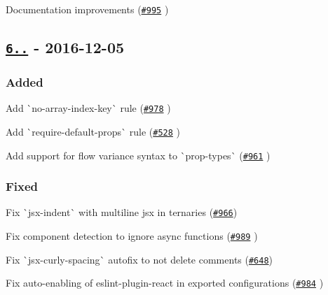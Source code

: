 \begin{DoxyItemize}
\item Documentation improvements (\href{https://github.com/yannickcr/eslint-plugin-react/pull/995}{\tt \#995} )
\end{DoxyItemize}

\subsection*{\href{https://github.com/yannickcr/eslint-plugin-react/compare/v6.7.1...v6.8.0}{\tt 6..} -\/ 2016-\/12-\/05}

\subsubsection*{Added}


\begin{DoxyItemize}
\item Add \`{}no-\/array-\/index-\/key\`{} rule (\href{https://github.com/yannickcr/eslint-plugin-react/pull/978}{\tt \#978} )
\item Add \`{}require-\/default-\/props\`{} rule (\href{https://github.com/yannickcr/eslint-plugin-react/issues/528}{\tt \#528} )
\item Add support for flow variance syntax to \`{}prop-\/types\`{} (\href{https://github.com/yannickcr/eslint-plugin-react/issues/961}{\tt \#961} )
\end{DoxyItemize}

\subsubsection*{Fixed}


\begin{DoxyItemize}
\item Fix \`{}jsx-\/indent\`{} with multiline jsx in ternaries (\href{https://github.com/yannickcr/eslint-plugin-react/issues/966}{\tt \#966})
\item Fix component detection to ignore async functions (\href{https://github.com/yannickcr/eslint-plugin-react/pull/989}{\tt \#989} )
\item Fix \`{}jsx-\/curly-\/spacing\`{} autofix to not delete comments (\href{https://github.com/yannickcr/eslint-plugin-react/issues/648}{\tt \#648})
\item Fix auto-\/enabling of {\ttfamily eslint-\/plugin-\/react} in exported configurations (\href{https://github.com/yannickcr/eslint-plugin-react/pull/984}{\tt \#984} )
\end{DoxyItemize}

